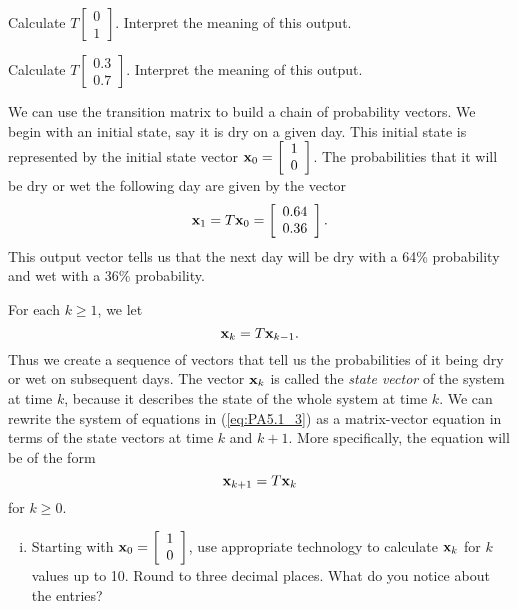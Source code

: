 \begin{example}
	\item Calculate $T\left[ \begin{array}{c} 0\\1 \end{array}\right] $. Interpret the meaning of this output.
	

	\item Calculate $T\left[ \begin{array}{c} 0.3\\0.7 \end{array}\right] $. Interpret the meaning of this output.


	\item We can use the transition matrix to build a chain of probability vectors. We begin with an initial state, say it is dry on a given day. This initial state is represented by the initial state vector $\mathbf{x}_0 = \left[ \begin{array}{c} 1\\0 \end{array}\right]$. The probabilities that it will be dry or wet the following day are given by the vector 
\[\mathbf{x}_1 = T\mathbf{x}_0 = \left[ \begin{array}{c} 0.64\\0.36 \end{array}\right].\]
This output vector tells us that the next day will be dry with a 64\% probability and wet with a 36\% probability. 

For each $k \geq 1$, we let 
\begin{equation} \label{eq:weather_chain}
\mathbf{x}_{k} = T\mathbf{x}_{k-1}.
\end{equation}
Thus we create a sequence of vectors that tell us the probabilities of it being dry or wet on subsequent days. The vector $\mathbf{x}_k$ is called the \emph{state vector} of the system at time $k$, because it describes the state of the whole system at time $k$. We can rewrite the system of equations in (\ref{eq:PA5.1_3}) as a matrix-vector equation in terms of the state vectors at time $k$ and $k+1$. More specifically, the equation will be of the form 
\begin{equation} \label{eq:weather_chain}
\mathbf{x}_{k+1} = T\mathbf{x}_k
\end{equation}
for $k \geq 0$. 
	\begin{enumerate}[i.]
	\item Starting with $\mathbf{x}_0 = \left[ \begin{array}{c} 1\\0 \end{array} \right]$, use appropriate technology to  calculate $\mathbf{x}_k$ for $k$ values up to 10. Round to three decimal places. What do you notice about the entries? 
	

\end{enumerate}
\end{example}
